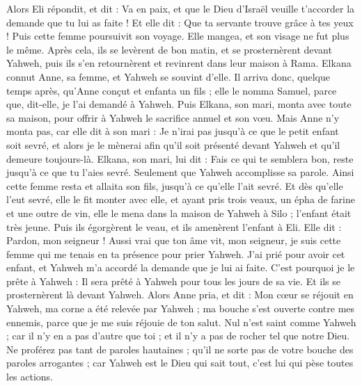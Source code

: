 \begin{multicols}{2}
Alors Eli répondit, et dit : Va en paix, et que le Dieu d'Israël veuille t'accorder la demande que tu lui as faite !
Et elle dit : Que ta servante trouve grâce à tes yeux ! Puis cette femme poursuivit son voyage. Elle mangea, et son visage ne fut plus le même.
Après cela, ils se levèrent de bon matin, et se prosternèrent devant Yahweh, puis ils s'en retournèrent et revinrent dans leur maison à Rama. Elkana connut Anne, sa femme, et Yahweh se souvint d'elle.
Il arriva donc, quelque temps après, qu'Anne conçut et enfanta un fils ; elle le nomma Samuel, parce que, dit-elle, je l'ai demandé à Yahweh.
Puis Elkana, son mari, monta avec toute sa maison, pour offrir à Yahweh le sacrifice annuel et son vœu.
Mais Anne n'y monta pas, car elle dit à son mari : Je n'irai pas jusqu'à ce que le petit enfant soit sevré, et alors je le mènerai afin qu'il soit présenté devant Yahweh et qu'il demeure toujours-là.
Elkana, son mari, lui dit : Fais ce qui te semblera bon, reste jusqu'à ce que tu l'aies sevré. Seulement que Yahweh accomplisse sa parole. Ainsi cette femme resta et allaita son fils, jusqu'à ce qu'elle l'ait sevré.
Et dès qu'elle l'eut sevré, elle le fit monter avec elle, et ayant pris trois veaux, un épha de farine et une outre de vin, elle le mena dans la maison de Yahweh à Silo ; l'enfant était très jeune.
Puis ils égorgèrent le veau, et ils amenèrent l'enfant à Eli.
Elle dit : Pardon, mon seigneur ! Aussi vrai que ton âme vit, mon seigneur, je suis cette femme qui me tenais en ta présence pour prier Yahweh.
J'ai prié pour avoir cet enfant, et Yahweh m'a accordé la demande que je lui ai faite.
C'est pourquoi je le prête à Yahweh : Il sera prêté à Yahweh pour tous les jours de sa vie. Et ils se prosternèrent là devant Yahweh.
\VerseOne{}Alors Anne pria, et dit : Mon cœur se réjouit en Yahweh, ma corne a été relevée par Yahweh ; ma bouche s'est ouverte contre mes ennemis, parce que je me suis réjouie de ton salut.
Nul n'est saint comme Yahweh ; car il n'y en a pas d'autre que toi ; et il n'y a pas de rocher tel que notre Dieu.
Ne proférez pas tant de paroles hautaines ; qu'il ne sorte pas de votre bouche des paroles arrogantes ; car Yahweh est le Dieu qui sait tout, c'est lui qui pèse toutes les actions.

\end{multicols}
